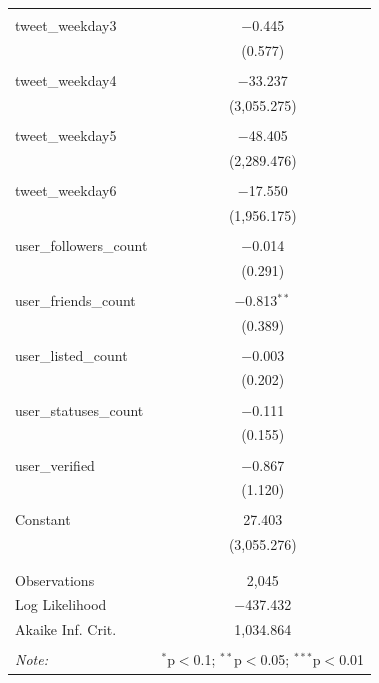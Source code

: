 \documentclass{article}
\begin{document}
\begin{longtable}{@{\extracolsep{10pt}}lc}
  & \\ 
 tweet\_weekday3 & $-$0.445 \\ 
  & (0.577) \\ 
  & \\ 
 tweet\_weekday4 & $-$33.237 \\ 
  & (3,055.275) \\ 
  & \\ 
 tweet\_weekday5 & $-$48.405 \\ 
  & (2,289.476) \\ 
  & \\ 
 tweet\_weekday6 & $-$17.550 \\ 
  & (1,956.175) \\ 
  & \\ 
 user\_followers\_count & $-$0.014 \\ 
  & (0.291) \\ 
  & \\ 
 user\_friends\_count & $-$0.813$^{**}$ \\ 
  & (0.389) \\ 
  & \\ 
 user\_listed\_count & $-$0.003 \\ 
  & (0.202) \\ 
  & \\ 
 user\_statuses\_count & $-$0.111 \\ 
  & (0.155) \\ 
  & \\ 
 user\_verified & $-$0.867 \\ 
  & (1.120) \\ 
  & \\ 
 Constant & 27.403 \\ 
  & (3,055.276) \\ 
  & \\ 
\hline \\[-1.8ex] 
Observations & 2,045 \\ 
Log Likelihood & $-$437.432 \\ 
Akaike Inf. Crit. & 1,034.864 \\ 
\hline 
\hline \\[-1.8ex] 
\textit{Note:}  & \multicolumn{1}{r}{$^{*}$p$<$0.1; $^{**}$p$<$0.05; $^{***}$p$<$0.01} \\ 
\end{longtable} 


\pagebreak
\end{document}
